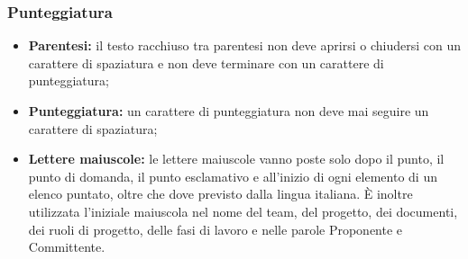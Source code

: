       \subsubsection{Punteggiatura}
        \begin{itemize}
          \item \textbf{Parentesi: }il testo racchiuso tra parentesi non deve aprirsi o chiudersi con un carattere di spaziatura e non deve terminare con un carattere di punteggiatura;
          \item \textbf{Punteggiatura: }un carattere di punteggiatura non deve mai seguire un carattere di spaziatura;
          \item \textbf{Lettere maiuscole: }le lettere maiuscole vanno poste solo dopo il punto, il punto di domanda, il punto esclamativo e all’inizio di ogni elemento di un elenco puntato,
          oltre che dove previsto dalla lingua italiana. È inoltre utilizzata l’iniziale maiuscola nel nome del team, del progetto, dei documenti, dei ruoli di progetto, delle fasi di
          lavoro e nelle parole Proponente e Committente.
        \end{itemize}
